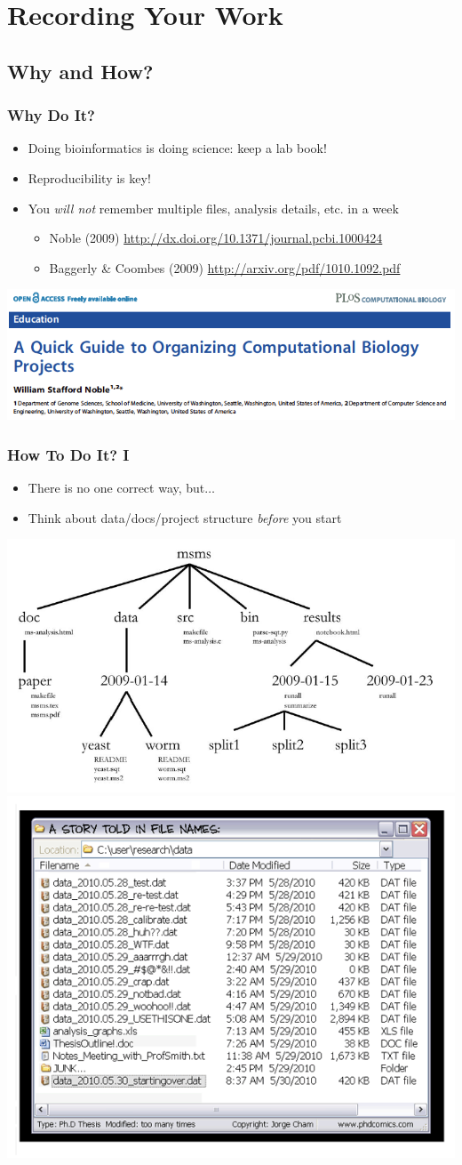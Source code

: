 \documentclass[table]{beamer}
\begin{document}
   \section{Recording Your Work}
   
   \subsection{Why and How?}
   \begin{frame}
     \frametitle{Why Do It?}
     \begin{itemize}
	   \item Doing bioinformatics is doing science: keep a lab book!
	   \item Reproducibility is key!
	   \item You \emph{will not} remember multiple files, analysis details, etc. in a week
	   \begin{itemize}
	     \item Noble (2009) \url{http://dx.doi.org/10.1371/journal.pcbi.1000424}
	     \item Baggerly \& Coombes (2009) \url{http://arxiv.org/pdf/1010.1092.pdf}
	   \end{itemize}
	\end{itemize}
	\includegraphics[width=.6\textwidth]{images/noble_2009_head}
   \end{frame}
   
   \begin{frame}
     \frametitle{How To Do It? I}
     \begin{itemize}
	   \item There is no one correct way, but$\ldots$
	   \item Think about data/docs/project structure \textit{before} you start
	\end{itemize}
    \includegraphics[width=.5\textwidth]{images/project_structure}
    \includegraphics[width=.5\textwidth]{images/phd052810s}
   \end{frame}
\end{document}
